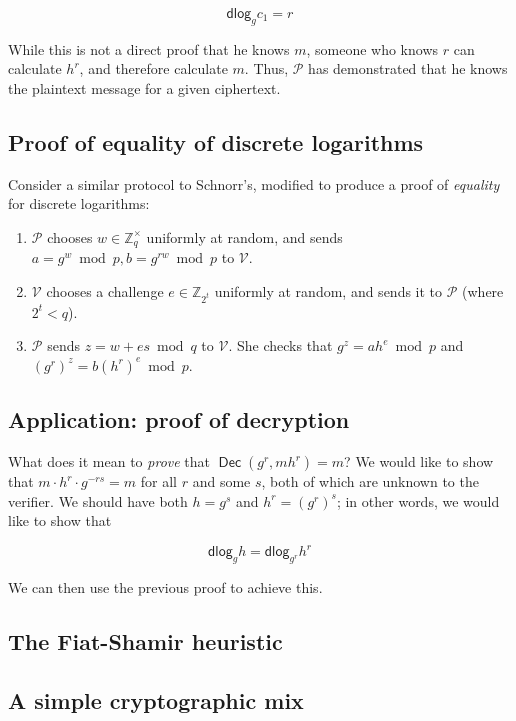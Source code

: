 \documentclass[11pt,twoside,a4paper]{article}
\DeclareMathOperator{\Dec}{\mathsf{Dec}}
\newcommand{\dlog}{\mathsf{dlog}}
\theoremstyle{definition}
\begin{document}
\[\dlog_g{c_1}=r\]

While this is not a direct proof that he knows \(m\), someone who knows \(r\) can calculate \(h^r\), and therefore calculate \(m\). Thus, \(\mathcal{P}\) has demonstrated that he knows the plaintext message for a given ciphertext.

\subsection{Proof of equality of discrete logarithms}
Consider a similar protocol to Schnorr's, modified to produce a proof of \textit{equality} for discrete logarithms:
\begin{enumerate}
    \item \(\mathcal{P}\) chooses \(w\in\mathbb{Z}^\times_q\) uniformly at random, and sends \(a=g^w\bmod p,b=g^{rw}\bmod p\) to \(\mathcal{V}\).
    \item \(\mathcal{V}\) chooses a challenge \(e\in\mathbb{Z}_{2^t}\) uniformly at random, and sends it to \(\mathcal{P}\) (where \(2^t<q\)).
    \item \(\mathcal{P}\) sends \(z=w+es\bmod q\) to \(\mathcal{V}\). She checks that \(g^z=ah^e\bmod p\) and \((g^r)^z=b(h^r)^e\bmod p\).
\end{enumerate}

\subsection{Application: proof of decryption}
What does it mean to \textit{prove} that \(\Dec(g^r,mh^r)=m\)? We would like to show that \(m\cdot h^r\cdot g^{-rs}=m\) for all \(r\) and some \(s\), both of which are unknown to the verifier. We should have both \(h=g^s\) and \(h^r=(g^r)^s\); in other words, we would like to show that

\[\dlog_g{h}=\dlog_{g^r}{h^r}\]

We can then use the previous proof to achieve this.
\subsection{The Fiat-Shamir heuristic}
\subsection{A simple cryptographic mix}
\end{document}
